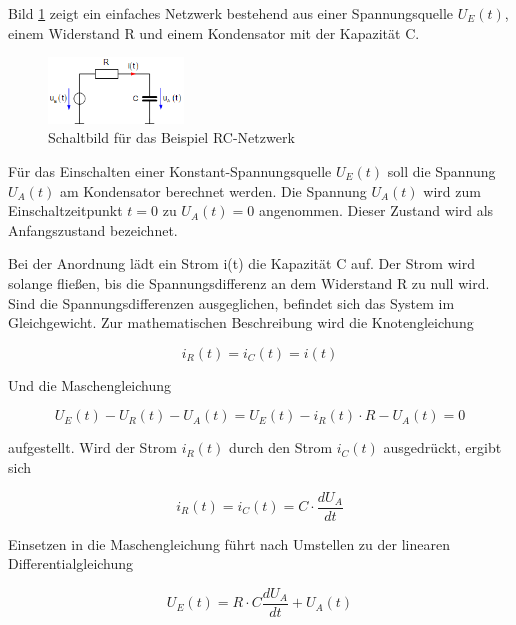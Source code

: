 \noindent Bild \ref{fig:RCSchaltbild} zeigt ein einfaches Netzwerk bestehend aus einer Spannungsquelle $U_{E}(t)$, einem Widerstand R und einem Kondensator mit der Kapazität C.
\begin{figure}[ht]
  \centerline{\includegraphics[width=0.32\textwidth]{Kapitel2/Bilder/image2}}
  \caption{Schaltbild für das Beispiel RC-Netzwerk}
  \label{fig:RCSchaltbild}
\end{figure}

\noindent Für das Einschalten einer Konstant-Spannungsquelle $U_{E}(t)$  soll die Spannung $U_{A}(t)$ am Kondensator berechnet werden. Die Spannung $U_{A}(t)$  wird zum Einschaltzeitpunkt $t=0$ zu $U_{A}(t)=0$ angenommen.
Dieser Zustand wird als Anfangszustand bezeichnet.

\noindent Bei der Anordnung lädt ein Strom i(t) die Kapazität C auf. Der Strom wird solange fließen, bis die Spannungsdifferenz an dem Widerstand R zu null wird. Sind die Spannungsdifferenzen ausgeglichen, befindet sich das System im Gleichgewicht. Zur mathematischen Beschreibung wird die Knotengleichung

\begin{equation}\label{eq:threethree}
i_{R}(t) = i_{C}(t) = i(t)
\end{equation}

\noindent Und die Maschengleichung

\begin{equation}\label{eq:threefour}
U_{E}(t) - U_{R}(t) - U_{A}(t)= U_{E}(t) - i_{R}(t)\cdot R - U_{A}(t) = 0
\end{equation}

\noindent aufgestellt. Wird der Strom $i_{R}(t)$ durch den Strom $i_{C}(t)$ ausgedrückt, ergibt sich

\begin{equation}\label{eq:threefive}
i_{R}(t) = i_{C}(t) = C\cdot \frac{d U_{A}}{dt}
\end{equation}

\noindent Einsetzen in die Maschengleichung führt nach Umstellen zu der linearen Differentialgleichung

\begin{equation}\label{eq:threesix}
U_{E}(t) = R\cdot C \frac{d U_{A}}{dt} + U_{A}(t)
\end{equation}

